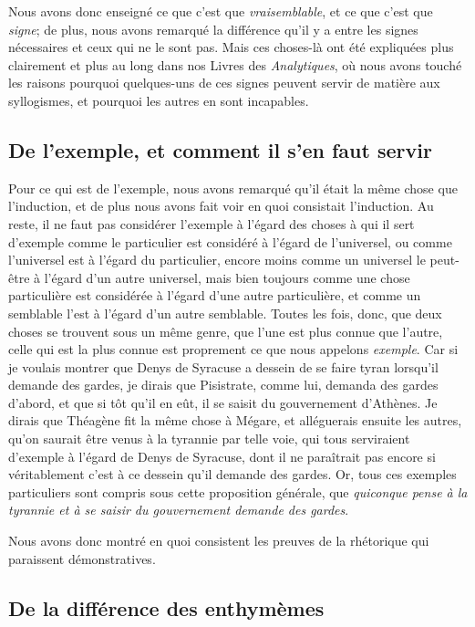 \bigbreak

Nous avons donc enseigné ce que c'est que \emph{vraisemblable}, et ce que c'est que \emph{signe}; de plus, nous avons remarqué la différence qu'il y
a entre les signes nécessaires et ceux qui ne le sont pas. Mais ces choses-là ont été expliquées plus clairement et plus au long dans nos Livres des
\emph{Analytiques}, où nous avons touché les raisons pourquoi quelques-uns de ces signes peuvent servir de matière aux syllogismes, et pourquoi les
autres en sont incapables.

\subsection{De l'exemple, et comment il s'en faut servir}

Pour ce qui est de l'exemple, nous avons remarqué qu'il était la même chose que l'induction, et de plus nous avons fait voir en quoi consistait l'induction.
Au reste, il ne faut pas considérer l'exemple à l'égard des choses à qui il sert d'exemple comme le particulier est considéré à l'égard de l'universel, ou
comme l'universel est à l'égard du particulier, encore moins comme un universel le peut-être à l'égard d'un autre universel, mais bien toujours comme une chose
particulière est considérée à l'égard d'une autre particulière, et comme un semblable l'est à l'égard d'un autre semblable. Toutes les fois, donc, que deux
choses se trouvent sous un même genre, que l'une est plus connue que l'autre, celle qui est la plus connue est proprement ce que nous appelons \emph{exemple}.
Car si je voulais montrer que Denys de Syracuse a dessein de se faire tyran lorsqu'il demande des gardes, je dirais que Pisistrate, comme lui, demanda des gardes
d'abord, et que si tôt qu'il en eût, il se saisit du gouvernement d'Athènes. Je dirais que Théagène fit la même chose à Mégare, et alléguerais ensuite les autres,
qu'on saurait être venus à la tyrannie par telle voie, qui tous serviraient d'exemple à l'égard de Denys de Syracuse, dont il ne paraîtrait pas encore si véritablement
c'est à ce dessein qu'il demande des gardes. Or, tous ces exemples particuliers sont compris sous cette proposition générale, que \emph{quiconque pense à la tyrannie
et à se saisir du gouvernement demande des gardes}.

Nous avons donc montré en quoi consistent les preuves de la rhétorique qui paraissent démonstratives.

\subsection{De la différence des enthymèmes}

